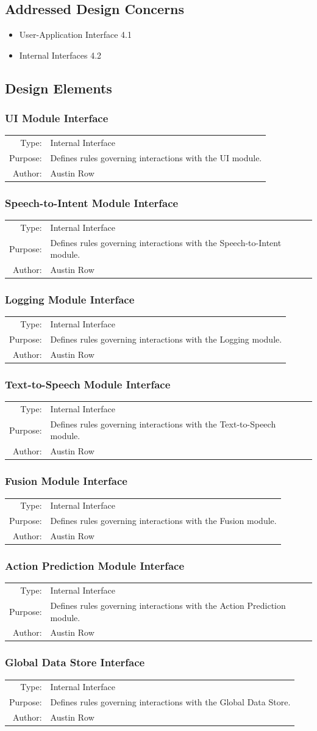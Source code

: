 \documentclass[onecolumn, draftclsnofoot,10pt, compsoc]{IEEEtran}
\newcommand{\designConcernRef}[2][]{
    #2 #1
}
\newcommand{\designElementDef}[4]{
    \subsubsection{#1}
    \begin{tabular}[t]{r p{6in}}
        Type: & #2 \\
        Purpose: & #3 \\
        Author: & #4 \\
    \end{tabular}
}
\begin{document}
    \subsection{Addressed Design Concerns}
        \begin{itemize}
            \item \designConcernRef[4.1]{User-Application Interface}
            \item \designConcernRef[4.2]{Internal Interfaces}
        \end{itemize}

    \subsection{Design Elements}
        \designElementDef{UI Module Interface}{Internal Interface}{Defines rules governing interactions with the UI module.}{Austin Row}
        \designElementDef{Speech-to-Intent Module Interface}{Internal Interface}{Defines rules governing interactions with the Speech-to-Intent module.}{Austin Row}
        \designElementDef{Logging Module Interface}{Internal Interface}{Defines rules governing interactions with the Logging module.}{Austin Row}
        \designElementDef{Text-to-Speech Module Interface}{Internal Interface}{Defines rules governing interactions with the Text-to-Speech module.}{Austin Row}
        \designElementDef{Fusion Module Interface}{Internal Interface}{Defines rules governing interactions with the Fusion module.}{Austin Row}
        \designElementDef{Action Prediction Module Interface}{Internal Interface}{Defines rules governing interactions with the Action Prediction module.}{Austin Row}
        \designElementDef{Global Data Store Interface}{Internal Interface}{Defines rules governing interactions with the Global Data Store.}{Austin Row}
\end{document}
